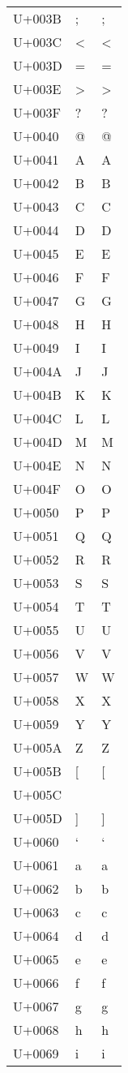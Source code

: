 \documentclass{article}
\begin{document}
\begin{longtable}{lll}
U+003B & ; & ; \\
U+003C & < & < \\
U+003D & = & = \\
U+003E & > & > \\
U+003F & ? & ? \\
U+0040 & @ & @ \\
U+0041 & A & A \\
U+0042 & B & B \\
U+0043 & C & C \\
U+0044 & D & D \\
U+0045 & E & E \\
U+0046 & F & F \\
U+0047 & G & G \\
U+0048 & H & H \\
U+0049 & I & I \\
U+004A & J & J \\
U+004B & K & K \\
U+004C & L & L \\
U+004D & M & M \\
U+004E & N & N \\
U+004F & O & O \\
U+0050 & P & P \\
U+0051 & Q & Q \\
U+0052 & R & R \\
U+0053 & S & S \\
U+0054 & T & T \\
U+0055 & U & U \\
U+0056 & V & V \\
U+0057 & W & W \\
U+0058 & X & X \\
U+0059 & Y & Y \\
U+005A & Z & Z \\
U+005B & [ & [ \\
U+005C & \ & \ \\
U+005D & ] & ] \\
U+0060 & ` & ` \\
U+0061 & a & a \\
U+0062 & b & b \\
U+0063 & c & c \\
U+0064 & d & d \\
U+0065 & e & e \\
U+0066 & f & f \\
U+0067 & g & g \\
U+0068 & h & h \\
U+0069 & i & i \\

\end{longtable}
\end{document}
